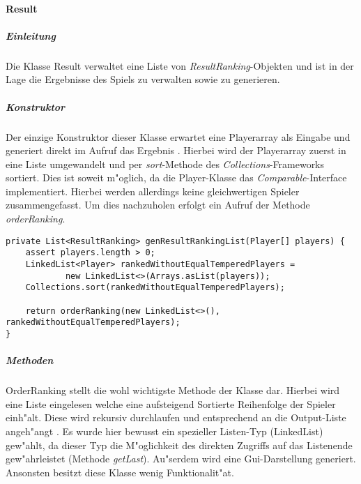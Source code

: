 \paragraph{Result}
\label{par:result}

\subparagraph{Einleitung}
Die Klasse Result verwaltet eine Liste von \emph{ResultRanking}-Objekten und ist in der Lage die Ergebnisse des Spiels zu verwalten sowie zu generieren. 

\subparagraph{Konstruktor}
Der einzige Konstruktor dieser Klasse erwartet eine Playerarray als Eingabe und generiert direkt im Aufruf das Ergebnis . Hierbei wird der Playerarray zuerst in eine Liste umgewandelt und per \emph{sort}-Methode des \emph{Collections}-Frameworks sortiert. Dies ist soweit m"oglich, da die Player-Klasse das \emph{Comparable}-Interface implementiert. Hierbei werden allerdings keine gleichwertigen Spieler zusammengefasst. Um dies nachzuholen erfolgt ein Aufruf der Methode \emph{orderRanking}.  

\begin{lstlisting}[float,style=CodeHighlighting,caption=Result - Konstruktor,label=lst:result_konstruktor]
private List<ResultRanking> genResultRankingList(Player[] players) {
    assert players.length > 0;
    LinkedList<Player> rankedWithoutEqualTemperedPlayers = 
    		new LinkedList<>(Arrays.asList(players));
    Collections.sort(rankedWithoutEqualTemperedPlayers);

    return orderRanking(new LinkedList<>(), rankedWithoutEqualTemperedPlayers);
}
\end{lstlisting}


\subparagraph{Methoden}
OrderRanking stellt die wohl wichtigste Methode der Klasse dar. Hierbei wird eine Liste eingelesen welche eine aufsteigend Sortierte Reihenfolge der Spieler einh"alt. Diese wird rekursiv durchlaufen und entsprechend an die Output-Liste angeh"angt . Es wurde hier bewusst ein spezieller Listen-Typ (LinkedList) gew"ahlt, da dieser Typ die M"oglichkeit des direkten Zugriffs auf das Listenende gew"ahrleistet (Methode \emph{getLast}). Au"serdem wird eine Gui-Darstellung generiert. Ansonsten besitzt diese Klasse wenig Funktionalit"at. 

